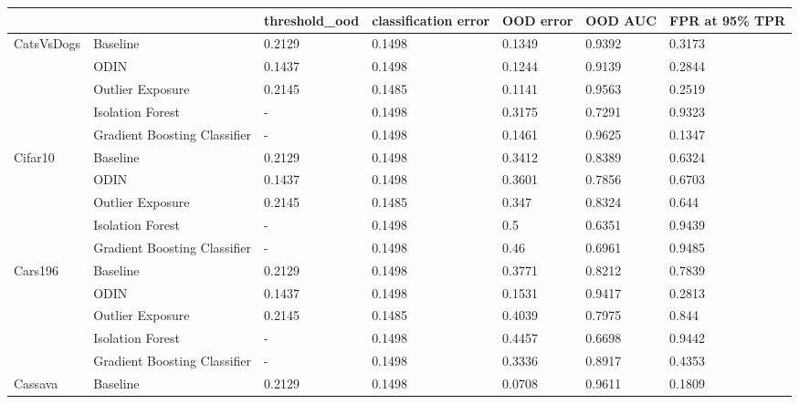 \begin{tabular}{lllllll}
\toprule
            &                              & threshold\_ood & classification error & OOD error & OOD AUC & FPR at 95\% TPR \\
\midrule
CatsVsDogs & Baseline &        0.2129 &               0.1498 &    0.1349 &  0.9392 &         0.3173 \\
            & ODIN &        0.1437 &               0.1498 &    0.1244 &  0.9139 &         0.2844 \\
            & Outlier Exposure &        0.2145 &               0.1485 &    0.1141 &  0.9563 &         0.2519 \\
            & Isolation Forest &             - &               0.1498 &    0.3175 &  0.7291 &         0.9323 \\
            & Gradient Boosting Classifier &             - &               0.1498 &    0.1461 &  0.9625 &         0.1347 \\
Cifar10 & Baseline &        0.2129 &               0.1498 &    0.3412 &  0.8389 &         0.6324 \\
            & ODIN &        0.1437 &               0.1498 &    0.3601 &  0.7856 &         0.6703 \\
            & Outlier Exposure &        0.2145 &               0.1485 &     0.347 &  0.8324 &          0.644 \\
            & Isolation Forest &             - &               0.1498 &       0.5 &  0.6351 &         0.9439 \\
            & Gradient Boosting Classifier &             - &               0.1498 &      0.46 &  0.6961 &         0.9485 \\
Cars196 & Baseline &        0.2129 &               0.1498 &    0.3771 &  0.8212 &         0.7839 \\
            & ODIN &        0.1437 &               0.1498 &    0.1531 &  0.9417 &         0.2813 \\
            & Outlier Exposure &        0.2145 &               0.1485 &    0.4039 &  0.7975 &          0.844 \\
            & Isolation Forest &             - &               0.1498 &    0.4457 &  0.6698 &         0.9442 \\
            & Gradient Boosting Classifier &             - &               0.1498 &    0.3336 &  0.8917 &         0.4353 \\
Cassava & Baseline &        0.2129 &               0.1498 &    0.0708 &  0.9611 &         0.1809 \\

\end{tabular}
